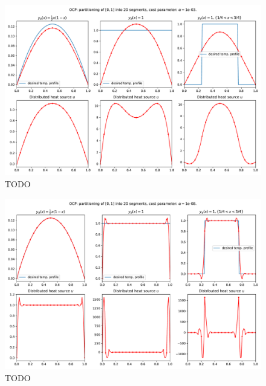 \begin{figure}[!h]
  \centering
  \includegraphics[width=\textwidth]{Images/plots/task2_fig_1.pdf}
  \caption{TODO}
  \label{fig:1}
\end{figure}

\begin{figure}[!h]
  \centering
  \includegraphics[width=\textwidth]{Images/plots/task2_fig_2.pdf}
  \caption{TODO}
  \label{fig:2}
\end{figure}



